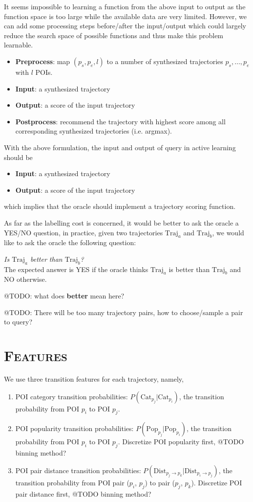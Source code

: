 \documentclass[11pt, a4paper]{article}
\begin{document}
It seems impossible to learning a function from the above input to output 
as the function space is too large while the available data are very limited.
However, we can add some processing steps before/after the input/output which could largely reduce 
the search space of possible functions and thus make this problem learnable.
\begin{itemize}
\item \textbf{Preprocess}: map $(p_s, p_e, l)$ to a number of synthesized trajectories $p_s, \dots, p_e$ with $l$ POIs.
\item \textbf{Input}: a synthesized trajectory
\item \textbf{Output}: a score of the input trajectory
\item \textbf{Postprocess}: recommend the trajectory with highest score among all corresponding synthesized trajectories (i.e. argmax).
\end{itemize}
With the above formulation, the input and output of query in active learning should be
\begin{itemize}
\item \textbf{Input}: a synthesized trajectory
\item \textbf{Output}: a score of the input trajectory
\end{itemize}
which implies that the oracle should implement a trajectory scoring function. 

As far as the labelling cost is concerned, it would be better to ask the oracle a YES/NO question,
in practice, given two trajectories $\text{Traj}_a$ and $\text{Traj}_b$, 
we would like to ask the oracle the following question: 

\textit{Is $\text{Traj}_a$ better than $\text{Traj}_b$?} \\
The expected answer is YES if the oracle thinks $\text{Traj}_a$ is better than $\text{Traj}_b$ and NO otherwise.

@TODO: what does \textbf{better} mean here?

@TODO: There will be too many trajectory pairs, how to choose/sample a pair to query?


\section{\textsc{Features}}
We use three transition features for each trajectory, namely,
\begin{enumerate}
\item POI category transition probabilities: 
      $P(\text{Cat}_{p_j} \vert \text{Cat}_{p_i})$, 
      the transition probability from POI $p_i$ to POI $p_j$.
\item POI popularity transition probabilities: 
      $P(\text{Pop}_{p_j} \vert \text{Pop}_{p_i})$, 
      the transition probability from POI $p_i$ to POI $p_j$.
      Discretize POI popularity first, 
      @TODO binning method?
\item POI pair distance transition probabilities: 
      $P(\text{Dist}_{p_j \to p_k} \vert \text{Dist}_{p_i \to p_j})$,
      the transition probability from POI pair ($p_i$, $p_j$) to pair ($p_j$, $p_k$).
      Discretize POI pair distance first,
      @TODO binning method?
\end{enumerate}
\end{document}

